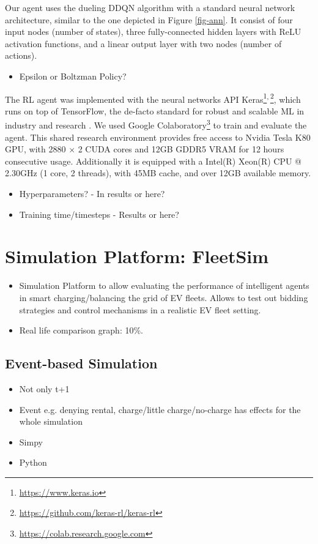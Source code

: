 \documentclass[a4paper, 12pt]{article}
\let\cite\shortcite
\begin{document}
Our agent uses the dueling DDQN algorithm with a standard neural network
architecture, similar to the one depicted in Figure \ref{fig-ann}. It consist of
four input nodes (number of states), three fully-connected hidden layers with
ReLU activation functions, and a linear output layer with two nodes (number of
actions).
\begin{itemize}
\item Epsilon or Boltzman Policy?
\end{itemize}
The RL agent was implemented with the neural networks API Keras\footnote{\url{https://www.keras.io}}\textsuperscript{,}\,\footnote{\url{https://github.com/keras-rl/keras-rl}},
which runs on top of TensorFlow, the de-facto standard for robust and scalable
ML in industry and research \cite{abadi16_tensor}. We used Google
Colaboratory\footnote{\url{https://colab.research.google.com}} to train and evaluate the
agent. This shared research environment provides free access to Nvidia Tesla K80
GPU, with 2880 \(\times\) 2 CUDA cores and 12GB GDDR5 VRAM for 12 hours
consecutive usage. Additionally it is equipped with a Intel(R) Xeon(R) CPU @
2.30GHz (1 core, 2 threads), with 45MB cache, and over 12GB available memory.

\begin{itemize}
\item Hyperparameters? - In results or here?
\item Training time/timesteps - Results or here?
\end{itemize}

\section{Simulation Platform: FleetSim}
\label{sec:org4601219}
\begin{itemize}
\item Simulation Platform to allow evaluating the performance of intelligent agents
in smart charging/balancing the grid of EV fleets. Allows to test out bidding strategies
and control mechanisms in a realistic EV fleet setting.
\item Real life comparison graph: 10\%.
\end{itemize}
\subsection{Event-based Simulation}
\label{sec:orgb56c0a2}
\begin{itemize}
\item Not only t+1
\item Event e.g. denying rental, charge/little charge/no-charge has effects for the
whole simulation
\item Simpy
\item Python
\end{itemize}
\end{document}
